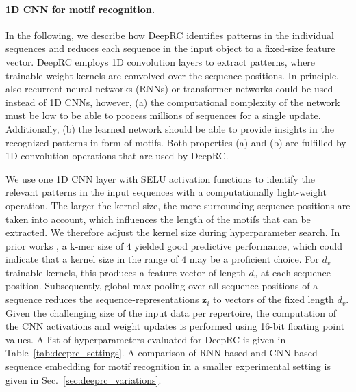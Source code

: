 \documentclass[oneside]{book}
\newcommand\Bz{\bm{z}}
\begin{document}
\paragraph{1D CNN for motif recognition.}
In the following,
we describe how DeepRC identifies patterns in the individual sequences and 
reduces each sequence in the input object to a fixed-size feature vector.
DeepRC employs 1D convolution layers to extract
patterns, where trainable weight kernels are convolved over the sequence positions.
In principle, also recurrent neural networks (RNNs) or transformer networks could be used
instead of 1D CNNs, however, (a) the computational complexity of the network 
must be low to be able to process millions of sequences for a single update. Additionally, 
(b) the learned network should be able to provide insights in the recognized patterns in form
of motifs. Both properties (a) and (b) are fulfilled by 1D convolution operations that are used
by DeepRC. 

%
We use one 1D CNN layer \citep{hu2014convolutional}
with SELU activation functions \citep{klambauer2017self}
to identify
the relevant patterns in the input sequences with a computationally light-weight operation.
%
The larger the kernel size,
the more surrounding sequence positions are taken into account,
which influences the length of the motifs that can be extracted.
We therefore adjust the kernel size 
during hyperparameter search.
In prior works \citep{ostmeyer2019biophysicochemical},  
%
a k-mer size of $4$ yielded good predictive performance,
which could indicate that a kernel size in the range of $4$ may 
be a proficient choice.
For $d_v$ trainable kernels, this produces a feature vector 
of length $d_v$ at each sequence position. %
Subsequently, global max-pooling over all sequence positions of a sequence reduces the sequence-representations $\Bz_i$ to vectors of the fixed length $d_v$. 
%
Given the challenging size of the input data per repertoire,
the computation of the CNN activations and weight updates is 
performed using 16-bit floating point values.
A list of hyperparameters evaluated for DeepRC is given in 
Table~\ref{tab:deeprc_settings}.
A comparison of RNN-based and CNN-based sequence embedding for motif recognition in a smaller experimental setting is given in Sec.~\ref{sec:deeprc_variations}.
\end{document}
